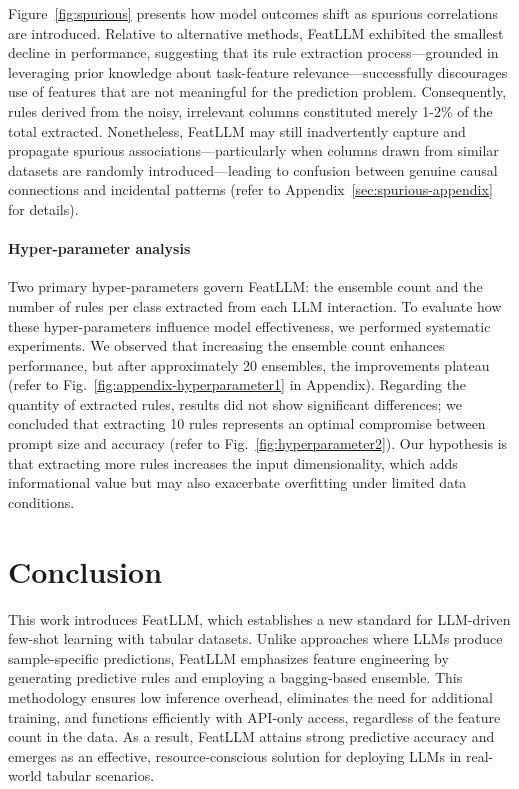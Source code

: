 Figure~\ref{fig:spurious} presents how model outcomes shift as spurious correlations are introduced. Relative to alternative methods, \textsf{FeatLLM} exhibited the smallest decline in performance, suggesting that its rule extraction process—grounded in leveraging prior knowledge about task-feature relevance—successfully discourages use of features that are not meaningful for the prediction problem. Consequently, rules derived from the noisy, irrelevant columns constituted merely 1-2\% of the total extracted. Nonetheless, \textsf{FeatLLM} may still inadvertently capture and propagate spurious associations—particularly when columns drawn from similar datasets are randomly introduced—leading to confusion between genuine causal connections and incidental patterns (refer to Appendix~\ref{sec:spurious-appendix} for details).

\vspace*{-0.12in}
\paragraph{Hyper-parameter analysis}
Two primary hyper-parameters govern \textsf{FeatLLM}: the ensemble count and the number of rules per class extracted from each LLM interaction. To evaluate how these hyper-parameters influence model effectiveness, we performed systematic experiments. We observed that increasing the ensemble count enhances performance, but after approximately 20 ensembles, the improvements plateau (refer to Fig.~\ref{fig:appendix-hyperparameter1} in Appendix). Regarding the quantity of extracted rules, results did not show significant differences; we concluded that extracting 10 rules represents an optimal compromise between prompt size and accuracy (refer to Fig.~\ref{fig:hyperparameter2}). Our hypothesis is that extracting more rules increases the input dimensionality, which adds informational value but may also exacerbate overfitting under limited data conditions.

\section{Conclusion}
This work introduces \textsf{FeatLLM}, which establishes a new standard for LLM-driven few-shot learning with tabular datasets. Unlike approaches where LLMs produce sample-specific predictions, \textsf{FeatLLM} emphasizes feature engineering by generating predictive rules and employing a bagging-based ensemble. This methodology ensures low inference overhead, eliminates the need for additional training, and functions efficiently with API-only access, regardless of the feature count in the data. As a result, \textsf{FeatLLM} attains strong predictive accuracy and emerges as an effective, resource-conscious solution for deploying LLMs in real-world tabular scenarios.

